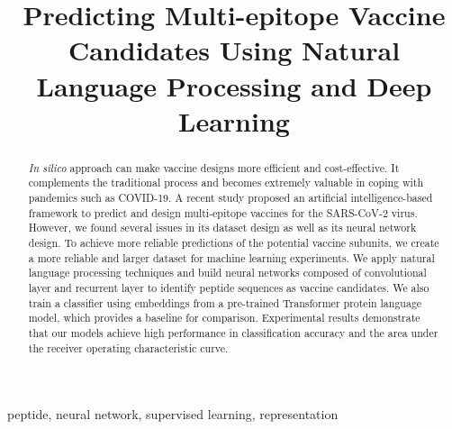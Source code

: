 \documentclass[conference]{IEEEtran}
\begin{document}
\title{Predicting Multi-epitope Vaccine Candidates Using Natural Language Processing and Deep Learning
}

\author{
}

\maketitle

\begin{abstract}
\emph{In silico} approach can make vaccine designs more efficient and cost-effective. It complements the traditional process and becomes extremely valuable in coping with pandemics such as COVID-19. A recent study proposed an artificial intelligence-based framework to predict and design multi-epitope vaccines for the SARS-CoV-2 virus. However, we found several issues in its dataset design as well as its neural network design. To achieve more reliable predictions of the potential vaccine subunits, we create a more reliable and larger dataset for machine learning experiments. We apply natural language processing techniques and build neural networks composed of convolutional layer and recurrent layer to identify peptide sequences as vaccine candidates. We also train a classifier using embeddings from a pre-trained Transformer protein language model, which provides a baseline for comparison. Experimental results demonstrate that our models achieve high performance in classification accuracy and the area under the receiver operating characteristic curve.
\end{abstract}

\begin{IEEEkeywords}
peptide, neural network, supervised learning, representation
\end{IEEEkeywords}
\end{document}
